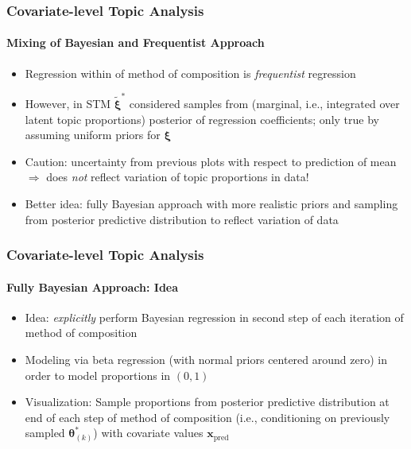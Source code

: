 \documentclass[xcolor=dvipsnames]{beamer}
\begin{document}
\begin{frame}
\frametitle{Covariate-level Topic Analysis}
\framesubtitle{Mixing of Bayesian and Frequentist Approach}
\begin{itemize}
\item Regression within of method of composition is \textit{frequentist} regression
\item However, in STM $\tilde{\boldsymbol{\xi}}^*$ considered samples from (marginal, i.e., integrated over latent topic proportions) posterior of regression coefficients; only true by assuming uniform priors for $\boldsymbol{\xi}$
\item Caution: uncertainty from previous plots with respect to prediction of mean $\Rightarrow$ does \textit{not} reflect variation of topic proportions in data!
\item Better idea: fully Bayesian approach with more realistic priors and sampling from posterior predictive distribution to reflect variation of data
\end{itemize}
\end{frame}

\begin{frame}
\frametitle{Covariate-level Topic Analysis}
\framesubtitle{Fully Bayesian Approach: Idea}
\begin{itemize}
\item Idea: \textit{explicitly} perform Bayesian regression in second step of each iteration of method of composition
\item Modeling via beta regression (with normal priors centered around zero) in order to model proportions in $(0,1)$
\item Visualization: Sample proportions from posterior predictive distribution at end of each step of method of composition (i.e., conditioning on previously sampled $\boldsymbol{\theta}_{(k)}^*$) with covariate values $\boldsymbol{x}_{\text{pred}}$
\end{itemize}
\end{frame}
\end{document}
